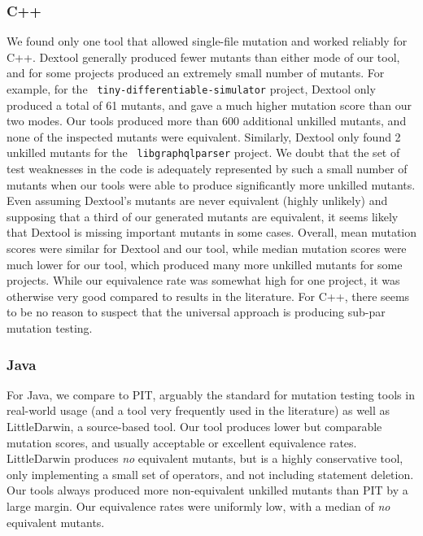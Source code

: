 \documentclass[sigconf,review, anonymous]{acmart}
\begin{document}
\subsubsection{C++}

We found only one tool that allowed single-file mutation and worked
reliably for C++.  Dextool generally produced fewer mutants than
either mode of our tool, and for some projects produced an extremely
small number of mutants.  For example, for the {\tt
  tiny-differentiable-simulator} project, Dextool only produced a
total of 61 mutants, and gave a much higher mutation score than our
two modes.  Our tools produced more than 600 additional unkilled
mutants, and none of the inspected mutants were equivalent.
Similarly, Dextool only found 2 unkilled mutants for the {\tt
  libgraphqlparser} project.  We doubt that the set of test weaknesses
in the code is adequately represented by such a small number of
mutants when our tools were able to produce significantly more
unkilled mutants.  Even assuming Dextool's mutants are never
equivalent (highly unlikely) and supposing that a third of our
generated mutants are equivalent, it seems likely that Dextool is
missing important mutants in some cases.  Overall, mean mutation
scores were similar for Dextool and our tool, while
median mutation scores were much lower for our tool, which produced
many more unkilled mutants for some projects.  While our equivalence
rate was somewhat high for one project, it was otherwise very good
compared to results in the literature.  For C++, there seems to
be no reason to suspect that the universal approach is producing
sub-par mutation testing.

\subsubsection{Java}

For Java, we compare to PIT, arguably the standard for mutation
testing tools in real-world usage (and a tool very frequently used in
the literature) as well as LittleDarwin, a source-based tool.  Our
tool produces lower but comparable mutation scores, and usually
acceptable or excellent equivalence rates.  LittleDarwin produces
\emph{no} equivalent mutants, but is a highly conservative tool, only
implementing a small set of operators, and not including statement
deletion.  Our tools always produced more non-equivalent unkilled
mutants than PIT by a large margin.  Our equivalence rates were
uniformly low, with a median of \emph{no} equivalent mutants.
\end{document}
